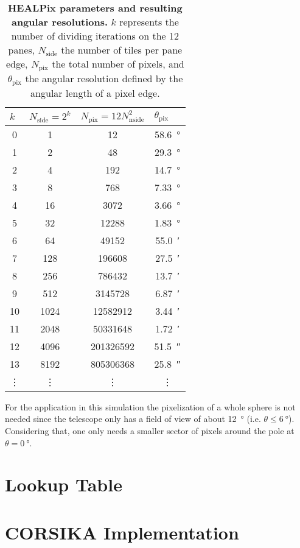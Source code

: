 \begin{table}[H]
\centering
\begin{tabular}{S[table-format=2.0]|S[table-format=4.0]|S[table-format=9.0]|S[table-format=2.2]}
 &  &  &  \\
  & 1    & 12        &  \SI{58.6}{\degree}\\
1  & 2    & 48        &  \SI{29.3}{\degree}\\
2  & 4    & 192       &  \SI{14.7}{\degree}\\
3  & 8    & 768 	  &  \SI{7.33}{\degree}\\
4  & 16   & 3072      &  \SI{3.66}{\degree}\\
5  & 32   & 12288     &  \SI{1.83}{\degree}\\
6  & 64   & 49152     &  \SI{55.0}{\arcminute}\\
7  & 128  & 196608    &  \SI{27.5}{\arcminute}\\
8  & 256  & 786432    &  \SI{13.7}{\arcminute}\\
9  & 512  & 3145728   &  \SI{6.87}{\arcminute}\\
10 & 1024 & 12582912  &  \SI{3.44}{\arcminute}\\
11 & 2048 & 50331648  &  \SI{1.72}{\arcminute}\\
12 & 4096 & 201326592 &  \SI{51.5}{\arcsecond}\\
13 & 8192 & 805306368 &  \SI{25.8}{\arcsecond}\\
 &  &  &  \\
\end{tabular}
\caption[HEALPix parameters and resulting angular resolutions]{\textbf{HEALPix parameters and resulting angular resolutions.} $k$ represents the number of dividing iterations on the 12 panes, $N_\text{side}$ the number of tiles per pane edge, $N_\text{pix}$ the total number of pixels, and $\theta_\text{pix}$ the angular resolution defined by the angular length of a pixel edge. \cite{healpix:paper}}
\end{table}

For the application in this simulation the pixelization of a whole sphere is not needed since the telescope only has a field of view of about \SI{12}{\degree} (i.e. $\theta \leq \SI{6}{\degree}$). Considering that, one only needs a smaller sector of pixels around the pole at $\theta = \SI{0}{\degree}$. 

\section{Lookup Table}

\section{CORSIKA Implementation}
